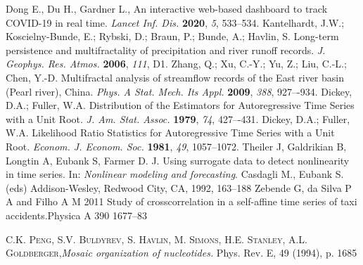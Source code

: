 \documentclass[onecolumn, preprint,aps,amsmath, amssymb, superscriptaddress]{revtex4}
\begin{document}
\begin{thebibliography}{99}
Dong E., Du H., Gardner L., An interactive web-based dashboard to track COVID-19 in real time. {\em Lancet Inf. Dis.} {\bf 2020}, {\em 5}, 533--534.
Kantelhardt, J.W.; Koscielny-Bunde, E.; Rybski, D.; Braun, P.; Bunde, A.; Havlin, S. Long-term persistence and multifractality of precipitation and river runoff records. {\em J. Geophys. Res. Atmos.} {\bf 2006}, {\em 111}, D1. 
Zhang, Q.; Xu, C.-Y.; Yu, Z.; Liu, C.-L.; Chen, Y.-D. Multifractal analysis of streamflow records of the East river basin (Pearl river), China. {\em Phys. A Stat. Mech. Its Appl.} {\bf 2009}, {\em 388}, 927–-934.
Dickey, D.A.; Fuller, W.A. Distribution of the Estimators for Autoregressive Time Series with a Unit Root. {\em J. Am. Stat. Assoc.} {\bf 1979}, {\em 74}, 427–-431.
Dickey, D.A.; Fuller, W.A. Likelihood Ratio Statistics for Autoregressive Time Series with a Unit Root. {\em Econom. J. Econom. Soc.} {\bf 1981}, {\em 49}, 1057–1072.
Theiler J, Galdrikian B, Longtin A, Eubank S, Farmer D. J. Using surrogate data to detect nonlinearity in time series. In: {\em Nonlinear modeling and forecasting}. Casdagli M., Eubank S.(eds) Addison-Wesley, Redwood City, CA, 1992, 163--188
Zebende G, da Silva P A and Filho A M 2011 Study of crosscorrelation
in a self-affine time series of taxi accidents.Physica A 390 1677–83

 \textsc{C.K. Peng, S.V. Buldyrev, S. Havlin, M. Simons, H.E. Stanley, A.L. Goldberger},\textit{Mosaic organization of nucleotides.} Phys. Rev. E, 49 (1994), p. 1685


\end{thebibliography}
\end{document}
